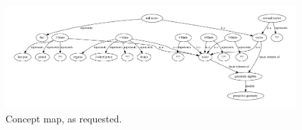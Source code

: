 \documentclass[a4paper,11pt,twoside]{article}
\begin{document}
\begin{figure}[t]
\includegraphics[width=1.0\textwidth]{conceptmap.pdf}
\caption{Concept map, as requested.}
\end{figure}

{}

\end{document}

